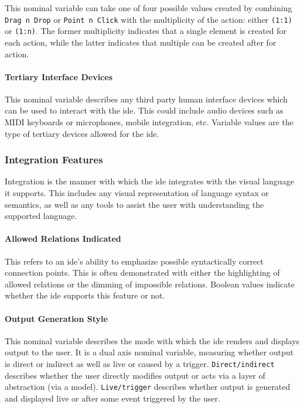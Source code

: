 This nominal variable can take one of four possible values created by
combining \texttt{Drag n Drop} or \texttt{Point n Click} with the
multiplicity of the action: either \texttt{(1:1)} or \texttt{(1:n)}. The
former multiplicity indicates that a single element is created for each
action, while the latter indicates that multiple can be created after for
action.


\paragraph{Tertiary Interface Devices} This nominal variable describes any
third party human interface devices which can be used to interact with the
\ac{ide}. This could include audio devices such as MIDI keyboards or
microphones, mobile integration, etc. Variable values are the type of
tertiary devices allowed for the \ac{ide}.


\subsubsection{Integration Features} \label{subsubsec:integration}

Integration is the manner with which the \ac{ide} integrates with the visual
language it supports. This includes any visual representation of language
syntax or semantics, as well as any tools to assist the user with
understanding the supported language.


\paragraph{Allowed Relations Indicated} This refers to an \ac{ide}'s ability to
emphasize possible syntactically correct connection points. This is often
demonstrated with either the highlighting of allowed relations or the
dimming of impossible relations. Boolean values indicate whether the \ac{ide}
supports this feature or not.


\paragraph{Output Generation Style} This nominal variable describes the
mode with which the \ac{ide} renders and displays output to the user. It is a
dual axis nominal variable, measuring whether output is direct or indirect
as well as live or caused by a trigger. \texttt{Direct/indirect} describes
whether the user directly modifies output or acts via a layer of
abstraction (\eg via a model). \texttt{Live/trigger} describes whether
output is generated and displayed live or after some event triggered by the
user.


